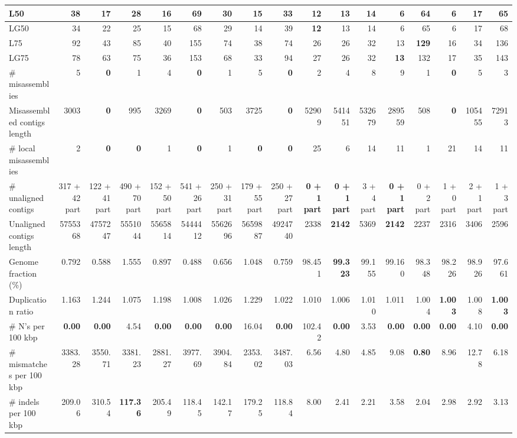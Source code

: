 \documentclass[12pt,a4paper]{article}
\begin{document}
\begin{table}[ht]
\begin{center}
\begin{tabular}{|l*{16}{|r}|}
L50 & 38 & 17 & 28 & 16 & 69 & 30 & 15 & 33 & {\bf 12} & 13 & 14 & 6 & 64 & 6 & 17 & 65 \\ \hline
LG50 & 34 & 22 & 25 & 15 & 68 & 29 & 14 & 39 & {\bf 12} & 13 & 14 & 6 & 65 & 6 & 17 & 68 \\ \hline
L75 & 92 & 43 & 85 & 40 & 155 & 74 & 38 & 74 & 26 & 26 & 32 & 13 & {\bf 129} & 16 & 34 & 136 \\ \hline
LG75 & 78 & 63 & 75 & 36 & 153 & 68 & 33 & 94 & 27 & 26 & 32 & {\bf 13} & 132 & 17 & 35 & 143 \\ \hline
\# misassemblies & 5 & {\bf 0} & 1 & 4 & {\bf 0} & 1 & 5 & {\bf 0} & 2 & 4 & 8 & 9 & 1 & {\bf 0} & 5 & 3 \\ \hline
Misassembled contigs length & 3003 & {\bf 0} & 995 & 3269 & {\bf 0} & 503 & 3725 & {\bf 0} & 52909 & 541451 & 532679 & 289559 & 508 & {\bf 0} & 105455 & 72913 \\ \hline
\# local misassemblies & 2 & {\bf 0} & {\bf 0} & 1 & {\bf 0} & 1 & {\bf 0} & {\bf 0} & 25 & 6 & 14 & 11 & 1 & 21 & 14 & 11 \\ \hline
\# unaligned contigs & 317 + 42 part & 122 + 41 part & 490 + 70 part & 152 + 50 part & 541 + 26 part & 250 + 31 part & 179 + 55 part & 250 + 27 part & {\bf 0 + 1 part} & {\bf 0 + 1 part} & 3 + 4 part & {\bf 0 + 1 part} & 0 + 2 part & 1 + 0 part & 2 + 1 part & 1 + 3 part \\ \hline
Unaligned contigs length & 5755368 & 4757247 & 5551044 & 5565814 & 5444412 & 5562696 & 5659887 & 4924740 & 2338 & {\bf 2142} & 5369 & {\bf 2142} & 2237 & 2316 & 3406 & 2596 \\ \hline
Genome fraction (\%) & 0.792 & 0.588 & 1.555 & 0.897 & 0.488 & 0.656 & 1.048 & 0.759 & 98.451 & {\bf 99.323} & 99.155 & 99.160 & 98.348 & 98.226 & 98.926 & 97.661 \\ \hline
Duplication ratio & 1.163 & 1.244 & 1.075 & 1.198 & 1.008 & 1.026 & 1.229 & 1.022 & 1.010 & 1.006 & 1.010 & 1.011 & 1.004 & {\bf 1.003} & 1.008 & {\bf 1.003} \\ \hline
\# N's per 100 kbp & {\bf 0.00} & {\bf 0.00} & 4.54 & {\bf 0.00} & {\bf 0.00} & {\bf 0.00} & 16.04 & {\bf 0.00} & 102.42 & {\bf 0.00} & 3.53 & {\bf 0.00} & {\bf 0.00} & {\bf 0.00} & 4.10 & {\bf 0.00} \\ \hline
\# mismatches per 100 kbp & 3383.28 & 3550.71 & 3381.23 & 2881.27 & 3977.69 & 3904.84 & 2353.02 & 3487.03 & 6.56 & 4.80 & 4.85 & 9.08 & {\bf 0.80} & 8.96 & 12.78 & 6.18 \\ \hline
\# indels per 100 kbp & 209.06 & 310.54 & {\bf 117.36} & 205.49 & 118.45 & 142.17 & 179.25 & 118.84 & 8.00 & 2.41 & 2.21 & 3.58 & 2.04 & 2.98 & 2.92 & 3.13 \\ \hline

\end{tabular}
\end{center}
\end{table}
\end{document}
